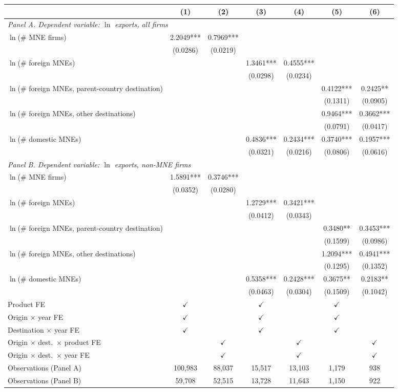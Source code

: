 \begin{tabular}{lcccccc} \hline
 & (1) & (2) & (3) & (4) & (5) & (6) \\ \hline
\multicolumn{7}{l}{\textit{Panel A. Dependent variable: $\ln$ exports, all firms}} \\
$\ln$(\# MNE firms) & 2.2049*** & 0.7969*** &  &  &  &  \\
 & (0.0286) & (0.0219) &  &  &  &  \\
$\ln$(\# foreign MNEs) &  &  & 1.3461*** & 0.4555*** &  &  \\
 &  &  & (0.0298) & (0.0234) &  &  \\
$\ln$(\# foreign MNEs, parent-country destination) &  &  &  &  & 0.4122*** & 0.2425** \\
 &  &  &  &  & (0.1311) & (0.0905) \\
$\ln$(\# foreign MNEs, other destinations) &  &  &  &  & 0.9464*** & 0.3662*** \\
 &  &  &  &  & (0.0791) & (0.0417) \\
$\ln$(\# domestic MNEs) &  &  & 0.4836*** & 0.2434*** & 0.3740*** & 0.1957*** \\
 &  &  & (0.0321) & (0.0216) & (0.0806) & (0.0616) \\
\midrule
\multicolumn{7}{l}{\textit{Panel B. Dependent variable: $\ln$ exports, non-MNE firms}} \\
$\ln$(\# MNE firms) & 1.5891*** & 0.3746*** &  &  &  &  \\
 & (0.0352) & (0.0280) &  &  &  &  \\
$\ln$(\# foreign MNEs) &  &  & 1.2729*** & 0.3421*** &  &  \\
 &  &  & (0.0412) & (0.0343) &  &  \\
$\ln$(\# foreign MNEs, parent-country destination) &  &  &  &  & 0.3480** & 0.3453*** \\
 &  &  &  &  & (0.1599) & (0.0986) \\
$\ln$(\# foreign MNEs, other destinations) &  &  &  &  & 1.2094*** & 0.4941*** \\
 &  &  &  &  & (0.1295) & (0.1352) \\
$\ln$(\# domestic MNEs) &  &  & 0.5358*** & 0.2428*** & 0.3675** & 0.2183** \\
 &  &  & (0.0463) & (0.0304) & (0.1509) & (0.1042) \\
\hline
Product FE & $\checkmark$ &  & $\checkmark$ &  & $\checkmark$ &  \\
Origin $\times$ year FE & $\checkmark$ &  & $\checkmark$ &  & $\checkmark$ &  \\
Destination $\times$ year FE & $\checkmark$ &  & $\checkmark$ &  & $\checkmark$ &  \\
Origin $\times$ dest.\ $\times$ product FE &  & $\checkmark$ &  & $\checkmark$ &  & $\checkmark$ \\
Origin $\times$ dest.\ $\times$ year FE &  & $\checkmark$ &  & $\checkmark$ &  & $\checkmark$ \\
Observations (Panel A) & 100,983 & 88,037 & 15,517 & 13,103 & 1,179 & 938 \\
Observations (Panel B) & 59,708 & 52,515 & 13,728 & 11,643 & 1,150 & 922 \\
\hline
\end{tabular}

